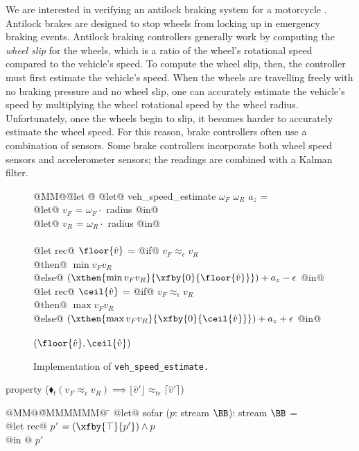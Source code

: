 
We are interested in verifying an antilock braking system for a motorcycle \cite{huang2010design}.
Antilock brakes are designed to stop wheels from locking up in emergency braking events.
Antilock braking controllers generally work by computing the \emph{wheel slip} for the wheels, which is a ratio of the wheel's rotational speed compared to the vehicle's speed.
To compute the wheel slip, then, the controller must first estimate the vehicle's speed.
When the wheels are travelling freely with no braking pressure and no wheel slip, one can accurately estimate the vehicle's speed by multiplying the wheel rotational speed by the wheel radius.
Unfortunately, once the wheels begin to slip, it becomes harder to accurately estimate the wheel speed.
For this reason, brake controllers often use a combination of sensors.
Some brake controllers \cite{kobayashi1995estimation} incorporate both wheel speed sensors and accelerometer sensors; the readings are combined with a Kalman filter.

\begin{figure}
\begin{tabbing}
  @MM@\= @let @\= \kill
  @let@ veh\_speed\_estimate $\omega_F$ $\omega_R$ $a_z$ = \\
    \> @let@ $v_F$ = $\omega_F \cdot $ radius @in@ \\
    \> @let@ $v_R$ = $\omega_R \cdot $ radius @in@ \\
    \\
    \> @let rec@ $\floor{\hat{v}}$ = @if@ $v_F \approx_\epsilon v_R$ \\
    \> \> @then@ $\min v_F v_R$ \\
    \> \> @else@ $(\xthen{\min v_F v_R}{\xfby{0}{\floor{\hat{v}}}}) + a_z - \epsilon$ @in@ \\
    \> @let rec@ $\ceil{\hat{v}}$ = @if@ $v_F \approx_\epsilon v_R$ \\
    \> \> @then@ $\max v_F v_R$ \\
    \> \> @else@ $(\xthen{\max v_F v_R}{\xfby{0}{\ceil{\hat{v}}}}) + a_z + \epsilon$ @in@ \\
    \\
    \> $(\floor{\hat{v}}, \ceil{\hat{v}})$
\end{tabbing}

\caption{Implementation of \tt{veh\_speed\_estimate}.}\label{f:veh-speed-estimate}
\end{figure}


property ($\blacklozenge_{t} (v_F \approx_{\epsilon} v_R) \implies \lfloor \hat{v}' \rfloor \approx_{t\epsilon} \lceil \hat{v}' \rceil$)




\begin{tabbing}
  @MM@\= @MMMMMM@ \= \kill
  @let@ sofar ($p$: stream $\BB$): stream $\BB$ = \\
    \> @let rec@ $p'$ $= (\xfby{\top}{p'}) \wedge p$ \\
    \> @in @ $p'$
\end{tabbing}

